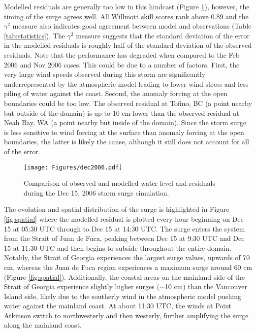 \documentclass[letterpaper]{tATO2e}
\begin{document}
Modelled residuals are generally too low in this hindcast (Figure \ref{fig:dec2006}), however, the timing of the surge agrees well. All Willmott skill scores rank above {\color{red}0.89} and the $\gamma^2$ measure also indicates good agreement between model and observations (Table \ref{tab:statistics}). The $\gamma^2$ measure suggests that the standard deviation of the error in the modelled residuals is roughly half of the standard deviation of the observed residuals. Note that the performance has degraded when compared to the Feb 2006 and Nov 2006 cases. This could be due to a number of factors. First, the very large wind speeds observed during this storm are significantly underrepresented by the atmospheric model leading to lower wind stress and less piling of water against the coast. Second, the anomaly forcing at the open boundaries could be too low. The observed residual at Tofino, BC (a point nearby but outside of the domain) is up to 10 cm  lower than the observed residual at Neah Bay, WA (a point nearby but inside of the domain). {\color{red} Since the storm surge is less sensitive to wind forcing at the surface than anomaly forcing at the open boundaries, the latter is likely the cause, although it still does not account for all of the error.} 

\begin{figure}
\centering
\texttt{[image: Figures/dec2006.pdf]}
\caption{Comparison of observed and modelled water level and residuals during the Dec 15, 2006 storm surge simulation. }
\label{fig:dec2006}
\end{figure}

The evolution and spatial distribution of the surge is highlighted in Figure \ref{fig:spatial} where the modelled residual is plotted every hour beginning on Dec 15 at 05:30 UTC through to Dec 15 at 14:30 UTC. The surge enters the system from the Strait of Juan de Fuca, peaking between Dec 15 at 9:30 UTC and Dec 15 at 11:30 UTC and then begins to subside throughout the entire domain. Notably, the Strait of Georgia experiences the largest surge values, upwards of {\color{red}70 cm}, whereas the Juan de Fuca region experiences a maximum surge around {\color{red}60 cm} {\color{red} (Figure \ref{fig:spatial})}. Additionally, the coastal areas on the mainland side of the Strait of Georgia experience slightly higher surges ($\sim$10 cm) than the Vancouver Island side, likely due to the southerly wind in the atmospheric model pushing water against the mainland coast. At about 11:30 UTC, the winds at Point Atkinson switch to northwesterly and then westerly, further amplifying the surge along the mainland coast. 
\end{document}
